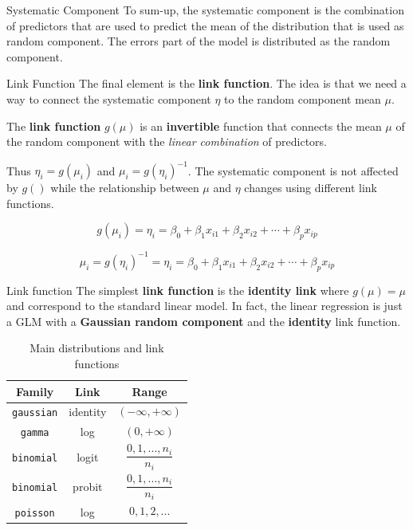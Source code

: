 \documentclass[
  ignorenonframetext,
]{beamer}
\begin{document}
\begin{frame}{Systematic Component}
\label{systematic-component-1}
To sum-up, the systematic component is the combination of predictors
that are used to predict the mean of the distribution that is used as
random component. The errors part of the model is distributed as the
random component.
\end{frame}

\begin{frame}{Link Function}
\label{link-function}
The final element is the \textbf{link function}. The idea is that we
need a way to connect the systematic component \(\eta\) to the random
component mean \(\mu\).

The \textbf{link function} \(g(\mu)\) is an \textbf{invertible} function
that connects the mean \(\mu\) of the random component with the
\emph{linear combination} of predictors.

Thus \(\eta_i = g(\mu_i)\) and \(\mu_i = g(\eta_i)^{-1}\). The
systematic component is not affected by \(g()\) while the relationship
between \(\mu\) and \(\eta\) changes using different link functions.

\[
g(\mu_i) = \eta_i = \beta_0 + \beta_1 x_{i1} + \beta_2 x_{i2} + \cdots + \beta_p x_{ip}
\]

\[
\mu_i = g(\eta_i)^{-1} = \eta_i = \beta_0 + \beta_1 x_{i1} + \beta_2 x_{i2} + \cdots + \beta_p x_{ip}
\]
\end{frame}

\begin{frame}{Link function}
\label{link-function-1}
The simplest \textbf{link function} is the \textbf{identity link} where
\(g(\mu) = \mu\) and correspond to the standard linear model. In fact,
the linear regression is just a GLM with a \textbf{Gaussian random
component} and the \textbf{identity} link function.

\begin{table}
\caption{Main distributions and link functions}\tabularnewline

\fontsize{12.0pt}{14.4pt}\selectfont
\begin{tabular*}{\linewidth}{@{\extracolsep{\fill}}ccc}
\toprule
{\bfseries Family} & {\bfseries Link} & {\bfseries Range} \\ 
\midrule\addlinespace[2.5pt]
\texttt{gaussian} & identity & $$(-\infty,+\infty)$$ \\ 
\texttt{gamma} & log & $$(0,+\infty)$$ \\ 
\texttt{binomial} & logit & $$\frac{0, 1, ..., n_{i}}{n_{i}}$$ \\ 
\texttt{binomial} & probit & $$\frac{0, 1, ..., n_{i}}{n_{i}}$$ \\ 
\texttt{poisson} & log & $$0, 1, 2, ...$$ \\ 
\bottomrule
\end{tabular*}
\end{table}
\end{frame}
\end{document}
